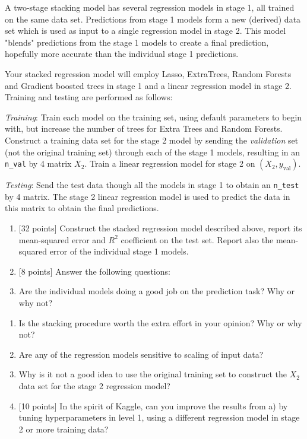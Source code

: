\documentclass[11pt]{article}
\begin{document}
A two-stage stacking model has several regression models in stage 1, all
trained on the same data set. Predictions from stage 1 models form a new
(derived) data set which is used as input to a single regression model
in stage 2. This model "blends" predictions from the stage 1 models to
create a final prediction, hopefully more accurate than the individual
stage 1 predictions.

Your stacked regression model will employ Lasso, ExtraTrees, Random
Forests and Gradient boosted trees in stage 1 and a linear regression
model in stage 2. Training and testing are performed as follows:

\emph{Training}: Train each model on the training set, using default
parameters to begin with, but increase the number of trees for Extra
Trees and Random Forests. Construct a training data set for the stage 2
model by sending the \emph{validation} set (not the original training
set) through each of the stage 1 models, resulting in an \texttt{n\_val}
by 4 matrix \(X_2\). Train a linear regression model for stage 2 on
\((X_2, y_\text{val})\).

\emph{Testing}: Send the test data though all the models in stage 1 to
obtain an \texttt{n\_test} by 4 matrix. The stage 2 linear regression
model is used to predict the data in this matrix to obtain the final
predictions.

\begin{enumerate}
\def\labelenumi{\alph{enumi})}
\item
  {[}32 points{]} Construct the stacked regression model described
  above, report its mean-squared error and \(R^2\) coefficient on the
  test set. Report also the mean-squared error of the individual stage 1
  models.
\item
  {[}8 points{]} Answer the following questions:
\item
  Are the individual models doing a good job on the prediction task? Why
  or why not?
\end{enumerate}

\begin{enumerate}
\def\labelenumi{\roman{enumi})}
\setcounter{enumi}{1}
\item
  Is the stacking procedure worth the extra effort in your opinion? Why
  or why not?
\item
  Are any of the regression models sensitive to scaling of input data?
\item
  Why is it not a good idea to use the original training set to
  construct the \(X_2\) data set for the stage 2 regression model?
\item
  {[}10 points{]} In the spirit of Kaggle, can you improve the results
  from a) by tuning hyperparameters in level 1, using a different
  regression model in stage 2 or more training data?
\end{enumerate}
\end{document}
